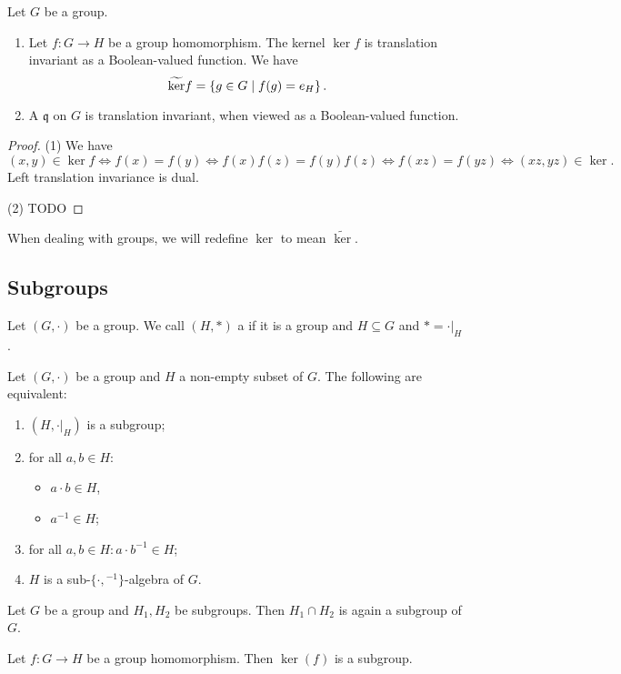 \begin{proposition}
Let $G$ be a group.
\begin{enumerate}
\item Let $f:G \to H$ be a group homomorphism. The kernel $\ker f$ is translation invariant as a Boolean-valued function. We have
\[ \widetilde{\ker}f = \left\{ g\in G \;\middle|\; f(g) = e_H \right\}. \]
\item A $\mathfrak{q}$ on $G$ is translation invariant, when viewed as a Boolean-valued function. 
\end{enumerate}
\end{proposition}
\begin{proof}
(1) We have
\[ (x,y)\in \ker f \iff f(x)=f(y) \iff f(x)f(z) = f(y)f(z) \iff f(xz) = f(yz) \iff (xz,yz)\in\ker. \]
Left translation invariance is dual.

(2) TODO
\end{proof}
When dealing with groups, we will redefine $\ker$ to mean $\widetilde{\ker}$.

\subsection{Subgroups}
\begin{definition}
Let $(G,\boldsymbol{\cdot})$ be a group. We call $(H,*)$ a  if it is a group and $H\subseteq G$ and $* = \boldsymbol{\cdot}|_H$.
\end{definition}

\begin{lemma} \label{subgroupCriterion}
Let $(G,\boldsymbol{\cdot})$ be a group and $H$ a non-empty subset of $G$. The following are equivalent:
\begin{enumerate}
\item $(H,\boldsymbol{\cdot}|_H)$ is a subgroup;
\item for all $a,b\in H$:
\begin{itemize}
\item $a\cdot b \in H$,
\item $a^{-1}\in H$;
\end{itemize}
\item for all $a,b\in H: a\cdot b^{-1} \in H$;
\item $H$ is a sub-$\{\cdot, {}^{-1}\}$-algebra of $G$.
\end{enumerate}
\end{lemma}

\begin{lemma}
Let $G$ be a group and $H_1, H_2$ be subgroups. Then $H_1\cap H_2$ is again a subgroup of $G$.
\end{lemma}
\begin{lemma}
Let $f:G\to H$ be a group homomorphism. Then $\ker(f)$ is a subgroup.
\end{lemma}

